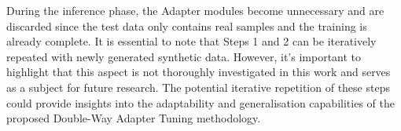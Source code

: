 During the inference phase, the Adapter modules become unnecessary and are discarded since the test data only contains real samples and the training is already complete. It is essential to note that Steps 1 and 2 can be iteratively repeated with newly generated synthetic data. However, it's important to highlight that this aspect is not thoroughly investigated in this work and serves as a subject for future research. The potential iterative repetition of these steps could provide insights into the adaptability and generalisation capabilities of the proposed Double-Way Adapter Tuning methodology.





